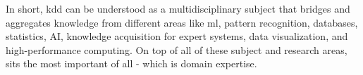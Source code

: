 In short, \ac{kdd} can be understood as a multidisciplinary subject that bridges and aggregates knowledge from different areas like \ac{ml}, pattern recognition, databases, statistics, AI, knowledge acquisition for expert systems, data visualization, and high-performance computing. On top of all of these subject and research areas, sits the most important of all - which is domain expertise.

